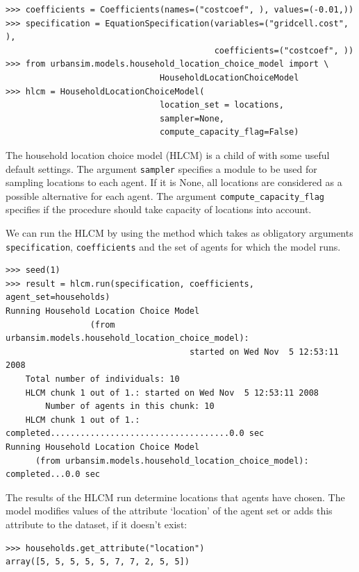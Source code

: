 \begin{verbatim}
>>> coefficients = Coefficients(names=("costcoef", ), values=(-0.01,))
>>> specification = EquationSpecification(variables=("gridcell.cost", ),
                                          coefficients=("costcoef", ))
>>> from urbansim.models.household_location_choice_model import \
                               HouseholdLocationChoiceModel
>>> hlcm = HouseholdLocationChoiceModel(
                               location_set = locations,
                               sampler=None,
                               compute_capacity_flag=False)
\end{verbatim}
The household location choice model (HLCM) is a child of 
 with some useful default settings.  
The argument \verb|sampler| specifies a module to be
used for sampling locations to each agent. If it is None, all locations are
considered as a possible alternative for each agent.  The argument
\verb|compute_capacity_flag| specifies if the procedure should take capacity of
locations into account.

We can run the HLCM by using the method 
which takes as obligatory arguments \verb|specification|, \verb|coefficients|
and the set of agents for which the model runs.  

\begin{verbatim}
>>> seed(1)
>>> result = hlcm.run(specification, coefficients, agent_set=households)
Running Household Location Choice Model 
                 (from urbansim.models.household_location_choice_model): 
                                     started on Wed Nov  5 12:53:11 2008
    Total number of individuals: 10
    HLCM chunk 1 out of 1.: started on Wed Nov  5 12:53:11 2008
        Number of agents in this chunk: 10
    HLCM chunk 1 out of 1.: completed....................................0.0 sec
Running Household Location Choice Model 
      (from urbansim.models.household_location_choice_model): completed...0.0 sec

\end{verbatim}

The results of the HLCM run determine locations that
agents have chosen. The model modifies values of the attribute `location' of
the agent set or adds this attribute to the dataset, if it doesn't exist:

\begin{verbatim}
>>> households.get_attribute("location")
array([5, 5, 5, 5, 5, 7, 7, 2, 5, 5])
\end{verbatim}

